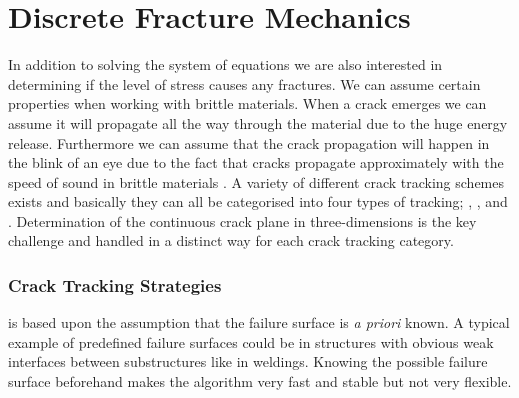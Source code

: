 



\section{Discrete Fracture Mechanics}
\label{sec:discrete-fracture-mechanics}
In addition to solving the system of equations we are also interested in
determining if the level of stress causes any fractures. We can
assume certain properties when working with brittle materials. When a
crack emerges we can assume it will propagate all the way through the
material due to the huge energy release. Furthermore we can assume
that the crack propagation will happen in the blink of an eye due to
the fact that cracks propagate approximately with the speed of sound in
brittle materials . A variety of different crack tracking schemes exists and
basically they can all be categorised into four types of tracking; , ,  and
. Determination of the continuous crack plane in
three-dimensions is the key challenge and handled in a distinct way
for each crack tracking category. \\

\subsubsection{Crack Tracking Strategies}
 is based upon the assumption that the failure
surface is \textit{a priori} known. A typical example of predefined
failure surfaces could be in structures with obvious weak interfaces
between substructures like in weldings. Knowing the possible failure
surface beforehand makes the algorithm very fast and stable but not
very flexible. \\

